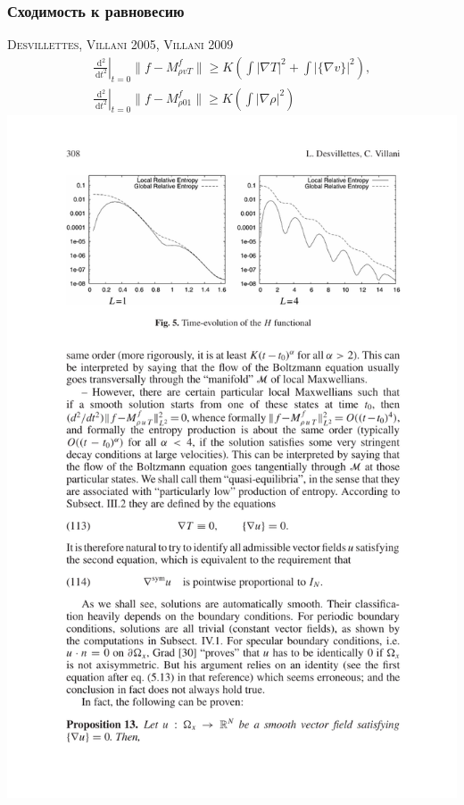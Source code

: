 \documentclass[mathserif]{beamer} %
\newcommand{\dd}{\:\mathrm{d}}
\newcommand{\pder}[2][]{\partial_{#2}{#1}}
\newcommand{\Cite}[2][]{\alert{\textsc{#2 #1}}}
\begin{document}
\begin{frame}
    \frametitle{Сходимость к равновесию}
    \Cite[2005]{Desvillettes, Villani}, \Cite[2009]{Villani}
    \begin{gather*}
        \left.\frac{\dd^2}{\dd{t}^2}\right|_{t=0} \| f-M^f_{\rho v T} \| \geq K\left(
            \int |\nabla{T}|^2 + \int |\{\nabla{v}\}|^2 \right), \\
        \left.\frac{\dd^2}{\dd{t}^2}\right|_{t=0} \| f-M^f_{\rho 0 1} \| \geq K\left(
            \int |\nabla{\rho}|^2 \right)
    \end{gather*}
    \hspace*{-20pt}\includegraphics{cutted/filbet}
\end{frame}

\end{document}
